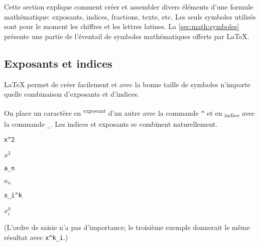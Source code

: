 Cette section explique comment créer et assembler divers éléments
d'une formule mathématique: exposants, indices, fractions, texte, etc.
Les seuls symboles utilisés sont pour le moment les chiffres et les
lettres latines. La \autoref{sec:math:symboles} présente une
partie de l'éventail de symboles mathématiques offerts par {\LaTeX}.

\subsection{Exposants et indices}
\label{sec:math:bases:exposants}

{\LaTeX} permet de créer facilement et avec la bonne taille de
symboles n'importe quelle combinaison d'exposants et d'indices.

On place un caractère en \textsuperscript{exposant} d'un autre avec la
commande \verb=^= et en \textsubscript{indice} avec la commande
\verb=_=. Les indices et exposants se combinent naturellement.
\begin{demo}
  \def\strut{\rule[-0.4ex]{0pt}{2ex}}
  \begin{minipage}{0.3\linewidth}
    \begin{texample}[0.6\linewidth]
\begin{lstlisting}
x^2
\end{lstlisting}
      \producing\strut $x^2$
    \end{texample}
  \end{minipage}
  \quad
  \begin{minipage}{0.3\linewidth}
    \begin{texample}[0.6\linewidth]
\begin{lstlisting}
a_n
\end{lstlisting}
      \producing\strut $a_n$
    \end{texample}
  \end{minipage}
  \quad
  \begin{minipage}{0.3\linewidth}
    \begin{texample}[0.63\linewidth]
\begin{lstlisting}
x_i^k
\end{lstlisting}
      \producing\strut $x_i^k$
    \end{texample}
  \end{minipage}
\end{demo}
(L'ordre de saisie n'a pas d'importance; le troisième exemple
donnerait le même résultat avec \verb=x^k_i=.)

